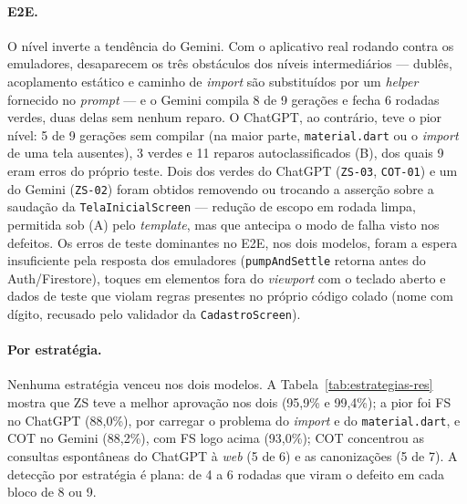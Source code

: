 \documentclass[12pt]{article}
\begin{document}
\paragraph{E2E.} O nível inverte a tendência do Gemini. Com o aplicativo real
rodando contra os emuladores, desaparecem os três obstáculos dos níveis
intermediários --- dublês, acoplamento estático e caminho de
\textit{import} são substituídos por um \textit{helper} fornecido no
\textit{prompt} --- e o Gemini compila 8 de 9 gerações e fecha 6 rodadas
verdes, duas delas sem nenhum reparo. O ChatGPT, ao contrário, teve o pior
nível: 5 de 9 gerações sem compilar (na maior parte, \texttt{material.dart}
ou o \textit{import} de uma tela ausentes), 3 verdes e 11 reparos
autoclassificados (B), dos quais 9 eram erros do próprio teste. Dois dos
verdes do ChatGPT (\texttt{ZS-03}, \texttt{COT-01}) e um do Gemini
(\texttt{ZS-02}) foram obtidos removendo ou trocando a asserção sobre a
saudação da \texttt{TelaInicialScreen} --- redução de escopo em rodada limpa, permitida sob
(A) pelo \textit{template}, mas que antecipa o modo de falha visto nos
defeitos. Os erros de teste dominantes no E2E, nos dois modelos, foram a
espera insuficiente pela resposta dos emuladores (\texttt{pumpAndSettle}
retorna antes do Auth/Firestore), toques em elementos fora do \textit{viewport}
com o teclado aberto e dados de teste que violam regras presentes no próprio
código colado (nome com dígito, recusado pelo validador da
\texttt{CadastroScreen}).

\paragraph{Por estratégia.} Nenhuma estratégia venceu nos dois modelos. A
Tabela~\ref{tab:estrategias-res} mostra que ZS teve a melhor aprovação nos
dois (95,9\% e 99,4\%); a pior foi FS no ChatGPT (88,0\%), por carregar o
problema do \textit{import} e do \texttt{material.dart}, e COT no Gemini
(88,2\%), com FS logo acima (93,0\%); COT concentrou as consultas espontâneas do ChatGPT à \textit{web} (5 de
6) e as canonizações (5 de 7). A detecção por estratégia é plana: de 4 a 6
rodadas que viram o defeito em cada bloco de 8 ou 9.
\end{document}
